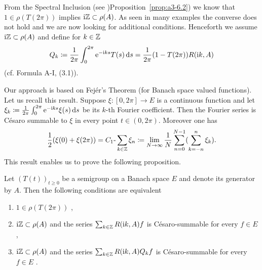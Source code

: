 From the Spectral Inclusion (see )Proposition~\ref{prop:a3-6.2}) we know that $1 \in \rho(T(2\pi))$ implies $\mathrm{i}\mathbb{Z} \subset \rho(A)$.
As seen in many examples the converse does not hold and we are now looking for additional conditions.
Henceforth we assume $\mathrm{i}\mathbb{Z} \subset \rho(A)$ and define for $k \in \mathbb{Z}$
\begin{equation}\label{eq:a3-7.7}
Q_{k}\coloneqq \frac{1}{2\pi}\int_{0}^{2\pi} \mathrm{e}^{-\mathrm{i} ks}T(s)\mathop{}\!\mathrm{d}{s} = \frac{1}{2\pi}(1 - T(2\pi))R(\mathrm{i} k,A)
\end{equation}
(cf. Formula A-I, (3.1)).

Our approach is based on Fejér's Theorem (for Banach space valued functions).
Let us recall this result.
Suppose $\xi \colon [0,2\pi] \to E$ is a continuous function and let $\xi_{k}\coloneqq \frac{1}{2\pi}\int_{0}^{2\pi} \mathrm{e}^{-\mathrm{i} ks}\xi(s)\mathop{}\!\mathrm{d}{s}$ be its $k$-th Fourier coefficient.
Then the Fourier series is Césaro summable to $\xi$ in every point $t \in (0,2\pi)$.
Moreover one has
\begin{equation}\label{eq:a3-7.8}
\frac{1}{2}(\xi(0) + \xi(2\pi)) = C_{1}\text{-}\sum_{k\in\mathbb{Z}} \xi_{n} \coloneqq \lim_{N\to\infty} \frac{1}{N}\sum_{n=0}^{N-1}(\sum_{k=-n}^{n} \xi_{k}) .
\end{equation}
This result enables us to prove the following proposition.
\begin{proposition}\label{prop:a3-7.8}
Let $(T(t))_{t\geq 0}$ be a semigroup on a Banach space $E$ and denote its generator by $A$.
Then the following conditions are equivalent
\begin{enumerate}[\upshape (a)]
\item $1 \in \rho(T(2\pi))$ ,

\item 
$\mathrm{i}\mathbb{Z} \subset \rho(A)$ and the series $\sum_{k\in\mathbb{Z}} R(\mathrm{i} k,A)f$ is Césaro-summable for every $f \in E$,

\item 
$\mathrm{i}\mathbb{Z} \subset \rho(A)$ and the series $\sum_{k\in\mathbb{Z}} R(\mathrm{i} k,A)Q_{k}f$ is Césaro-summable for every $f \in E$ .

\end{enumerate}
\end{proposition}
